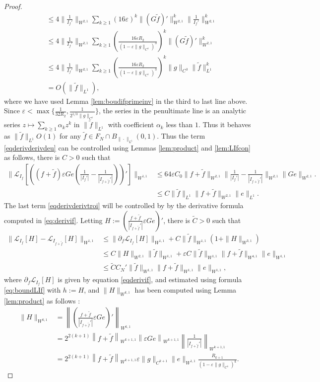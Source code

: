 \documentclass[12pt]{article}
\def\L{\mathcal{L}}
\newcommand{\eps}{\varepsilon}
\theoremstyle{plain}
\begin{document}
{\begin{proof}
\begin{align*}
&\leq 4\|\frac{1}{I_{f}'}\|_{W^{2,1}}\sum_{k\geq 1}(16\eps)^k\|(G\tilde f)'\|_{W^{2,1}}^k\|\frac 1 {I_f'}\|_{W^{2,1}}^k\\
&\leq 4\|\frac{1}{I_{f}'}\|_{W^{2,1}}\sum_{k\geq 1}(\frac{16\eps R_2}{(1-\eps\|g\|_{C^1})^3})^k\|(G\tilde f)'\|_{W^{2,1}}^k\\
&\leq 4\|\frac{1}{I_{f}'}\|_{W^{2,1}}\sum_{k\geq 1}(\frac{16\eps R_2}{(1-\eps\|g\|_{C^1})^3})^k\|g\|_{C^3}\|\tilde f\|_{L ^1}^k\\
    &=O(\|\tilde f\|_{L^1}),
\end{align*}
where we have used Lemma \ref{lem:boudifprimeinv} in the third to last line above.
Since $\eps< \max\{\frac{1}{32R_2},\frac{1}{2^{1/3}\|g\|_{C^1}}\}$, the series in the penultimate line is an analytic series $z\mapsto \sum_{k\geq 1}\alpha_kz^k$ in $\|\tilde f\|_{L^1}$ with coefficient $\alpha_k$ less than $1$. 
Thus it behaves as $\|\tilde f\|_{L^1}O(1)$ for any $\tilde f\in F_N\cap B_{\|\cdot\|_{L^1}}(0,1)$.
Thus the term \eqref{eqderivderivdeu} can be controlled using Lemmas \ref{lem:product} and \ref{lem:LIfcon} as follows, there is $C>0$ such that
\begin{align}\label{eq:contderiv2}
    \|\L_{I_{f}}\left[\left((f+\tilde f) \eps G e (\frac{1}{|I_{f}'|}-\frac{1}{|I_{f+\tilde f}'|} )\right)'\right]\|_{W^{1,1}}&\leq 64\eps C_0\|f+\tilde f\|_{W^{2,1}}\|\frac{1}{|I_{f}'|}-\frac{1}{|I_{f+\tilde f}'|}\|_{W^{2,1}}\|Ge\|_{W^{2,1}}.\\
    &\leq C\|\tilde f\|_{L^1}\|f+\tilde f\|_{W^{2,1}}\|e\|_{L^1}.\nonumber
\end{align}
The last term \eqref{eqderivderivtroi} will be controlled by by the derivative formula computed in \eqref{eq:derivif}. Letting $H:=\left(\frac{f+\tilde f}{|I_{f+\tilde f}'|} \eps G e\right)'$, there is $\tilde C>0$ such that
\begin{align}
    \|\L_{I_{f}}\left[H\right]-\L_{I_{f+\tilde f}}\left[H\right]\|_{W^{1,1}}&\leq \|\partial_f\L_{I_f}[H]\|_{W^{1,1}}+ C\|\tilde f\|_{W^{1,1}}(1+\|H\|_{W^{3,1}})\nonumber\\
    &\leq C\|H\|_{W^{2,1}}\|\tilde f\|_{W^{1,1}}+ \eps C\|\tilde f\|_{W^{1,1}}\|f+\tilde f\|_{W^{4,1}}\|e\|_{W^{1,1}}\nonumber\\
    &\leq \tilde CC_N'\|\tilde f\|_{W^{1,1}}\|f+\tilde f\|_{W^{1,1}}\|e\|_{W^{1,1}},\label{eq:contderiv3}
\end{align}
where $\partial_f\L_{I_f}[H]$ is given by equation \eqref{eqderivif}, and estimated using formula \eqref{eq:boundLIf} with $h:=H$, and $\|H\|_{W^{k,1}}$ has been computed using Lemma \ref{lem:product} as follows :
\begin{align*}
    \|H\|_{W^{k,1}}&=\left\|\left(\frac{f+\tilde f}{|I_{f+\tilde f}'|} \eps G e\right)'\right\|_{W^{k,1}}\\
    &=2^{2(k+1)}\left\|f+\tilde f\right\|_{W^{k+1,1}}\left\|\eps G e\right\|_{W^{k+1,1}}\left\|\frac 1 {|I_{f+\tilde f}'|}\right\|_{W^{k+1,1}}\\
    &=2^{2(k+1)}\left\|f+\tilde f\right\|_{W^{k+1,1}}\eps\| g\|_{C^{k+1}} \|e\|_{W^{1,1}}\frac{R_{k+1}}{(1-\eps\|g\|_{C^1})^k}.
\end{align*}


\end{proof}}
\end{document}
